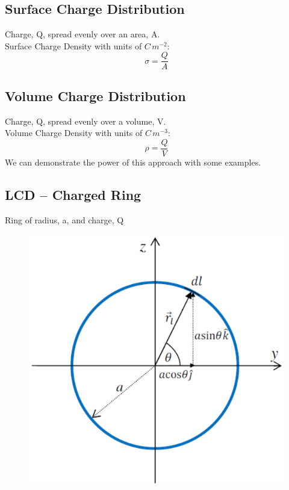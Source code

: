 \documentclass[a4paper, 11pt, fleqn, normalem]{report}
\begin{document}
\subsection{Surface Charge Distribution}
Charge, Q, spread evenly over an area, A. \\
Surface Charge Density with units of $C\,m^{-2}$:
\begin{equation*}
    \sigma = \frac{Q}{A}
\end{equation*}

\subsection{Volume Charge Distribution}
Charge, Q, spread evenly over a volume, V. \\
Volume Charge Density with units of $C\,m^{-3}$:
\begin{equation*}
    \rho = \frac{Q}{V}
\end{equation*}
We can demonstrate the power of this approach with some examples.

\subsection{LCD -- Charged Ring}
Ring of radius, a, and charge, Q

\begin{figure}[H]
    \includegraphics[scale=0.4]{Selection_004.png}
\end{figure}
\end{document}
